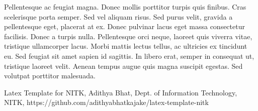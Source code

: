 \documentclass{article}[12pt,a4paper]
\begin{document}
Pellentesque ac feugiat magna. 
Donec mollis porttitor turpis quis finibus. 
Cras scelerisque porta semper. 
Sed vel aliquam risus. 
Sed purus velit, gravida a pellentesque eget, placerat at ex. 
Donec pulvinar lacus eget massa consectetur facilisis. 
Donec a turpis nulla. 
Pellentesque orci neque, laoreet quis viverra vitae, tristique ullamcorper lacus. 
Morbi mattis lectus tellus, ac ultricies ex tincidunt eu. 
Sed feugiat sit amet sapien id sagittis. 
In libero erat, semper in consequat ut, tristique laoreet velit. 
Aenean tempus augue quis magna suscipit egestas. 
Sed volutpat porttitor malesuada. 
\newpage
\begin{thebibliography}{1}
    
 Latex Template for NITK, Adithya Bhat, Dept. of Information Technology, NITK, https://github.com/adithyabhatkajake/latex-template-nitk

\end{thebibliography}
\end{document}
